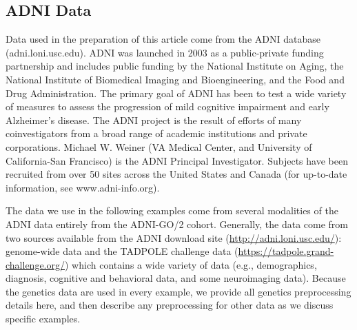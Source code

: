 \documentclass[12pt]{article}
\begin{document}
\hypertarget{adni-data}{%
\subsection{ADNI Data}\label{adni-data}}

\label{section:data}

Data used in the preparation of this article come from the ADNI database
(adni.loni.usc.edu). ADNI was launched in 2003 as a public-private
funding partnership and includes public funding by the National
Institute on Aging, the National Institute of Biomedical Imaging and
Bioengineering, and the Food and Drug Administration. The primary goal
of ADNI has been to test a wide variety of measures to assess the
progression of mild cognitive impairment and early Alzheimer's disease.
The ADNI project is the result of efforts of many coinvestigators from a
broad range of academic institutions and private corporations. Michael
W. Weiner (VA Medical Center, and University of California-San
Francisco) is the ADNI Principal Investigator. Subjects have been
recruited from over 50 sites across the United States and Canada (for
up-to-date information, see www.adni-info.org).

The data we use in the following examples come from several modalities
of the ADNI data entirely from the ADNI-GO/2 cohort. Generally, the data
come from two sources available from the ADNI download site
(\url{http://adni.loni.usc.edu/}): genome-wide data and the TADPOLE
challenge data (\url{https://tadpole.grand-challenge.org/}) which
contains a wide variety of data (e.g., demographics, diagnosis,
cognitive and behavioral data, and some neuroimaging data). Because the
genetics data are used in every example, we provide all genetics
preprocessing details here, and then describe any preprocessing for
other data as we discuss specific examples.
\end{document}
